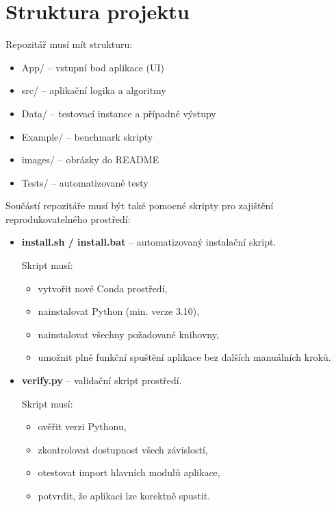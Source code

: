 \documentclass[12pt,a4paper]{article}
\begin{document}
\section{Struktura projektu}

Repozitář musí mít strukturu:

\begin{itemize}
    \item App/ -- vstupní bod aplikace (UI)
    \item src/ -- aplikační logika a algoritmy
    \item Data/ -- testovací instance a případné výstupy
    \item Example/ -- benchmark skripty
    \item images/ -- obrázky do README
    \item Tests/ -- automatizované testy
\end{itemize}

Součástí repozitáře musí být také pomocné skripty pro zajištění reprodukovatelného prostředí:

\begin{itemize}
    \item \textbf{install.sh / install.bat} – automatizovaný instalační skript.
    
    Skript musí:
    \begin{itemize}
        \item vytvořit nové Conda prostředí,
        \item nainstalovat Python (min. verze 3.10),
        \item nainstalovat všechny požadované knihovny,
        \item umožnit plně funkční spuštění aplikace bez dalších manuálních kroků.
    \end{itemize}

    \item \textbf{verify.py} – validační skript prostředí.
    
    Skript musí:
    \begin{itemize}
        \item ověřit verzi Pythonu,
        \item zkontrolovat dostupnost všech závislostí,
        \item otestovat import hlavních modulů aplikace,
        \item potvrdit, že aplikaci lze korektně spustit.
    \end{itemize}
\end{itemize}
\end{document}
